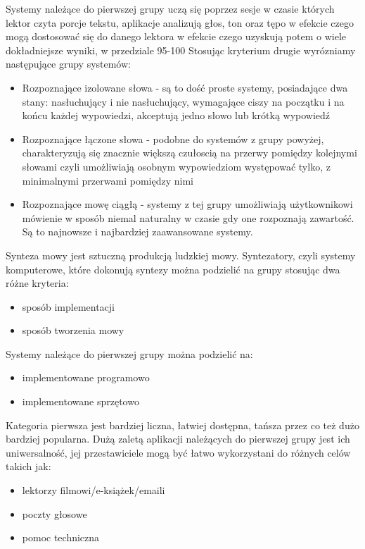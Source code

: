 Systemy należące do pierwszej grupy uczą się poprzez sesje w czasie których lektor czyta porcje tekstu, aplikacje analizują głos, ton oraz tępo  w efekcie czego mogą dostosować się do danego lektora w efekcie czego uzyskują potem o wiele dokładniejsze wyniki, w przedziale 95-100%
Stosując kryterium drugie wyrózniamy następujące grupy systemów:
\begin{itemize}
	\item Rozpoznające izolowane słowa - są to dość proste systemy, posiadające dwa stany: nasłuchujący i nie nasłuchujący,  wymagające ciszy na początku i na końcu każdej wypowiedzi,  akceptują jedno słowo lub krótką wypowiedź 
	\item Rozpoznające łączone słowa - podobne do systemów z grupy powyżej, charakteryzują się znacznie większą czułoscią na przerwy pomiędzy kolejnymi słowami czyli umożliwiają osobnym wypowiedziom występować tylko, z minimalnymi przerwami pomiędzy nimi
	\item Rozpoznające mowę ciągłą -  systemy z tej grupy umożliwiają użytkownikowi mówienie w sposób niemal naturalny w czasie gdy one rozpoznają zawartość. Są to najnowsze i najbardziej zaawansowane systemy.
\end{itemize}   
Synteza mowy jest sztuczną produkcją ludzkiej mowy. Syntezatory, czyli systemy komputerowe, które dokonują syntezy można podzielić na grupy stosując dwa różne kryteria:
\begin{itemize}
	\item sposób implementacji
	\item sposób tworzenia mowy
\end{itemize}
Systemy należące do pierwszej grupy można podzielić na:
\begin{itemize}
	\item implementowane programowo
	\item implementowane sprzętowo
\end{itemize}
Kategoria pierwsza jest bardziej liczna, łatwiej dostępna, tańsza przez co też dużo bardziej popularna. Dużą zaletą aplikacji należących do pierwszej grupy jest ich uniwersalność, jej przestawiciele  mogą być łatwo wykorzystani do różnych celów takich jak:
\begin{itemize}
	\item lektorzy filmowi/e-książek/emaili
	\item poczty głosowe
	\item pomoc techniczna
\end{itemize}
